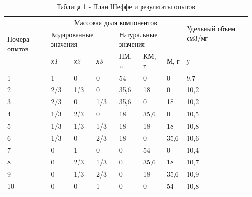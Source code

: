 \begin{table}[H]
\caption*{Таблица 1 - План Шеффе и результаты опытов}
\centering
\begin{tabular}{|l|llllll|l|}
\hline
\multirow{3}{*}{Номера опытов} &
  \multicolumn{6}{c|}{Массовая доля компонентов} &
  \multirow{2}{*}{Удельный объем, см3/мг} \\ \cline{2-7}
 &
  \multicolumn{3}{l|}{Кодированные значения} &
  \multicolumn{3}{l|}{Натуральные значения} &
   \\ \cline{2-8} 
 &
  \multicolumn{1}{l|}{\textit{х1}} &
  \multicolumn{1}{l|}{\textit{х2}} &
  \multicolumn{1}{l|}{\textit{х3}} &
  \multicolumn{1}{l|}{НМ, u} &
  \multicolumn{1}{l|}{КМ, г} &
  М, г &
  \textit{у} \\ \hline
1 &
  \multicolumn{1}{l|}{1} &
  \multicolumn{1}{l|}{0} &
  \multicolumn{1}{l|}{0} &
  \multicolumn{1}{l|}{54} &
  \multicolumn{1}{l|}{0} &
  0 &
  9,7 \\ \hline
2 &
  \multicolumn{1}{l|}{2/3} &
  \multicolumn{1}{l|}{1/3} &
  \multicolumn{1}{l|}{0} &
  \multicolumn{1}{l|}{35,6} &
  \multicolumn{1}{l|}{18} &
  0 &
  10,2 \\ \hline
3 &
  \multicolumn{1}{l|}{2/3} &
  \multicolumn{1}{l|}{0} &
  \multicolumn{1}{l|}{1/3} &
  \multicolumn{1}{l|}{35,6} &
  \multicolumn{1}{l|}{0} &
  18 &
  10,2 \\ \hline
4 &
  \multicolumn{1}{l|}{1/3} &
  \multicolumn{1}{l|}{2/3} &
  \multicolumn{1}{l|}{0} &
  \multicolumn{1}{l|}{18} &
  \multicolumn{1}{l|}{35,6} &
  0 &
  10,5 \\ \hline
5 &
  \multicolumn{1}{l|}{1/3} &
  \multicolumn{1}{l|}{1/3} &
  \multicolumn{1}{l|}{1/3} &
  \multicolumn{1}{l|}{18} &
  \multicolumn{1}{l|}{18} &
  18 &
  10,8 \\ \hline
6 &
  \multicolumn{1}{l|}{1/3} &
  \multicolumn{1}{l|}{0} &
  \multicolumn{1}{l|}{2/3} &
  \multicolumn{1}{l|}{18} &
  \multicolumn{1}{l|}{0} &
  35,6 &
  10,6 \\ \hline
7 &
  \multicolumn{1}{l|}{0} &
  \multicolumn{1}{l|}{1} &
  \multicolumn{1}{l|}{0} &
  \multicolumn{1}{l|}{0} &
  \multicolumn{1}{l|}{54} &
  0 &
  10,4 \\ \hline
8 &
  \multicolumn{1}{l|}{0} &
  \multicolumn{1}{l|}{2/3} &
  \multicolumn{1}{l|}{1/3} &
  \multicolumn{1}{l|}{0} &
  \multicolumn{1}{l|}{35,6} &
  18 &
  10,7 \\ \hline
9 &
  \multicolumn{1}{l|}{0} &
  \multicolumn{1}{l|}{1/3} &
  \multicolumn{1}{l|}{2/3} &
  \multicolumn{1}{l|}{0} &
  \multicolumn{1}{l|}{18} &
  35,6 &
  10,9 \\ \hline
10 &
  \multicolumn{1}{l|}{0} &
  \multicolumn{1}{l|}{0} &
  \multicolumn{1}{l|}{1} &
  \multicolumn{1}{l|}{0} &
  \multicolumn{1}{l|}{0} &
  54 &
  10,8 \\ \hline
\end{tabular}
\end{table}

